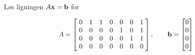 \begin{oppgave}
Løs ligningen $A\mathbf{x}=\mathbf{b}$ for 
\begin{punkt}
\vspace{-10pt}
$$A=
\begin{bmatrix}
\;0 & 1 & 1 & 0 & 0 & 0 & 1\;\\
\;0 & 0 & 0 & 0 & 1 & 0 & 1\;\\
\;0 & 0 & 0 & 0 & 0 & 1 & 1\;\\
\;0 & 0 & 0 & 0 & 0 & 0 & 0\;
\end{bmatrix},
\qquad
\mathbf{b}=
\begin{bmatrix}
0  \\
0 \\
0 \\
0
\end{bmatrix}
$$
\end{punkt}


\end{oppgave}
